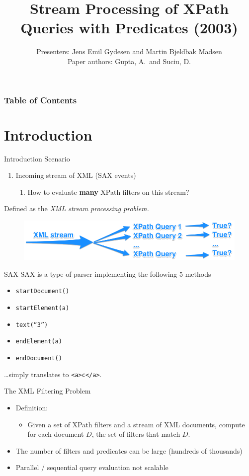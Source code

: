 \documentclass[mathserif,serif]{beamer}
\title{\large Stream Processing of XPath Queries with Predicates (2003)}
\author{Presenters: Jens Emil Gydesen and Martin Bjeldbak Madsen \\
        Paper authors: Gupta, A.\ and Suciu, D.}
\date{\DTMdisplaydate{2015}{6}{4}{3}}
\begin{document}
\frame{\titlepage}

\begin{frame}
  \frametitle{Table of Contents}
  \tableofcontents[hideallsubsections]
\end{frame}


\section{Introduction}
\begin{frame}{Introduction}
  Scenario
  \begin{enumerate}
    \item Incoming stream of XML (SAX events)
      \begin{enumerate}
        \item How to evaluate \textbf{many} XPath filters on this stream?
      \end{enumerate}
  \end{enumerate}
  Defined as the \textit{XML stream processing problem.}

  \begin{figure}[<+htpb+>]
    \centering
    \includegraphics[width=\linewidth]{processing-problem.png}
  \end{figure}
\end{frame}

\begin{frame}{SAX}
  SAX is a type of parser implementing the following 5 methods
  \begin{itemize}
    \item[] \texttt{startDocument()}
    \item[] \quad\texttt{startElement(a)}
    \item[] \quad\quad\texttt{text(``3'')}
    \item[] \quad\texttt{endElement(a)}
    \item[] \texttt{endDocument()}
  \end{itemize}
  \dots simply translates to \texttt{<a>c</a>}.
\end{frame}

\begin{frame}{The XML Filtering Problem}
  \begin{itemize}
    \item Definition:
      \begin{itemize}
        \item Given a set of XPath filters and a stream of XML documents, compute for each document $D$, the set of filters that match $D$.
      \end{itemize}
    \item The number of filters and predicates can be large (hundreds of thousands)
    \item Parallel / sequential query evaluation not scalable
  \end{itemize}
\end{frame}
\end{document}
